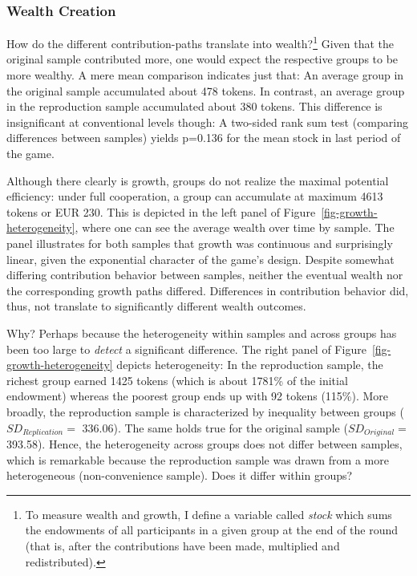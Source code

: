 \documentclass[
  authoryear,
  review,
  3p,
  onecolumn]{elsarticle}
\begin{document}
\hypertarget{sec-wealth}{%
\subsubsection{Wealth Creation}\label{sec-wealth}}

How do the different contribution-paths translate into
wealth?\footnote{To measure wealth and growth, I define a variable
  called \emph{stock} which sums the endowments of all participants in a
  given group at the end of the round (that is, after the contributions
  have been made, multiplied and redistributed).} Given that the
original sample contributed more, one would expect the respective groups
to be more wealthy. A mere mean comparison indicates just that: An
average group in the original sample accumulated about 478 tokens. In
contrast, an average group in the reproduction sample accumulated about
380 tokens. This difference is insignificant at conventional levels
though: A two-sided rank sum test (comparing differences between
samples) yields p=0.136 for the mean stock in last period of the game.

Although there clearly is growth, groups do not realize the maximal
potential efficiency: under full cooperation, a group can accumulate at
maximum 4613 tokens or EUR 230. This is depicted in the left panel of
Figure~\ref{fig-growth-heterogeneity}, where one can see the average
wealth over time by sample. The panel illustrates for both samples that
growth was continuous and surprisingly linear, given the exponential
character of the game's design. Despite somewhat differing contribution
behavior between samples, neither the eventual wealth nor the
corresponding growth paths differed. Differences in contribution
behavior did, thus, not translate to significantly different wealth
outcomes.

Why? Perhaps because the heterogeneity within samples and across groups
has been too large to \emph{detect} a significant difference. The right
panel of Figure~\ref{fig-growth-heterogeneity} depicts heterogeneity: In
the reproduction sample, the richest group earned 1425 tokens (which is
about 1781\% of the initial endowment) whereas the poorest group ends up
with 92 tokens (115\%). More broadly, the reproduction sample is
characterized by inequality between groups (\(SD_{Replication} =\)
336.06). The same holds true for the original sample
(\(SD_{Original} =\) 393.58). Hence, the heterogeneity across groups
does not differ between samples, which is remarkable because the
reproduction sample was drawn from a more heterogeneous (non-convenience
sample). Does it differ within groups?
\end{document}

